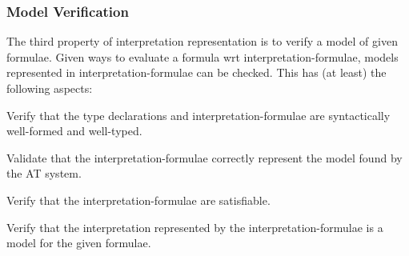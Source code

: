\documentclass{easychair}
\newenvironment{packed_enumerate}{
\vspace*{-0.3em}
\begin{enumerate}
\setlength{\partopsep}{0pt}
\setlength{\itemsep}{1pt}
\setlength{\parskip}{0pt}
\setlength{\parsep}{0pt}
}{\end{enumerate}}
\begin{document}
\subsubsection{Model Verification}
\label{Verification}

The third property of interpretation representation is to verify a model of given formulae.
Given ways to evaluate a formula wrt interpretation-formulae, models represented in
interpretation-formulae can be checked.
This has (at least) the following aspects: 
\begin{packed_enumerate}
\item Verify that the type declarations and interpretation-formulae are syntactically well-formed 
      and well-typed. 
\item Validate that the interpretation-formulae correctly represent the model found by the AT
      system.
\item Verify that the interpretation-formulae are satisfiable.
\item Verify that the interpretation represented by the interpretation-formulae is a model for 
      the given formulae.
\end{packed_enumerate}
\end{document}
